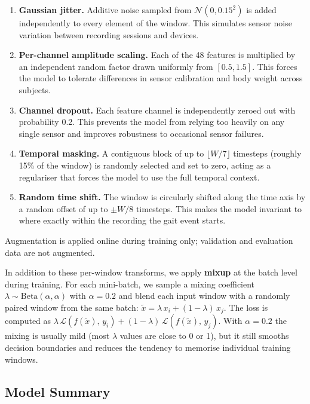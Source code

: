 \documentclass[11pt,a4paper,twocolumn]{article}
\begin{document}
\begin{enumerate}
\item \textbf{Gaussian jitter.} Additive noise sampled from $\mathcal{N}(0, 0.15^2)$ is added independently to every element of the window. This simulates sensor noise variation between recording sessions and devices.
\item \textbf{Per-channel amplitude scaling.} Each of the 48 features is multiplied by an independent random factor drawn uniformly from $[0.5, 1.5]$. This forces the model to tolerate differences in sensor calibration and body weight across subjects.
\item \textbf{Channel dropout.} Each feature channel is independently zeroed out with probability 0.2. This prevents the model from relying too heavily on any single sensor and improves robustness to occasional sensor failures.
\item \textbf{Temporal masking.} A contiguous block of up to $\lfloor W/7 \rfloor$ timesteps (roughly 15\% of the window) is randomly selected and set to zero, acting as a regulariser that forces the model to use the full temporal context.
\item \textbf{Random time shift.} The window is circularly shifted along the time axis by a random offset of up to $\pm W/8$ timesteps. This makes the model invariant to where exactly within the recording the gait event starts.
\end{enumerate}

Augmentation is applied online during training only; validation and evaluation data are not augmented.

In addition to these per-window transforms, we apply \textbf{mixup} at the batch level during training. For each mini-batch, we sample a mixing coefficient $\lambda \sim \text{Beta}(\alpha, \alpha)$ with $\alpha = 0.2$ and blend each input window with a randomly paired window from the same batch: $\tilde{x} = \lambda\, x_i + (1 - \lambda)\, x_j$. The loss is computed as $\lambda\, \mathcal{L}(f(\tilde{x}),\, y_i) + (1 - \lambda)\, \mathcal{L}(f(\tilde{x}),\, y_j)$. With $\alpha = 0.2$ the mixing is usually mild (most $\lambda$ values are close to 0 or 1), but it still smooths decision boundaries and reduces the tendency to memorise individual training windows.

\subsection{Model Summary}
\end{document}
